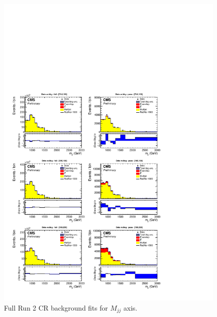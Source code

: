 \begin{figure}[!htb]
	\centering
	\includegraphics[width=1\textwidth]{Figures/postfit_projy_fitb_CR.pdf}
	\caption{Full Run 2 CR background fits for $M_{jj}$ axis.}
	\label{fig:18CRmjj}
\end{figure}

\clearpage

